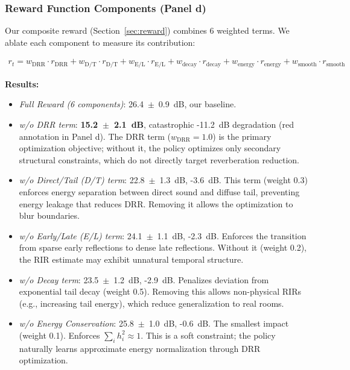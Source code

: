 \documentclass[12pt,a4paper]{article}
\begin{document}
\subsubsection{Reward Function Components (Panel d)}

Our composite reward (Section~\ref{sec:reward}) combines 6 weighted terms. We ablate each component to measure its contribution:

\begin{align}
r_t = w_\text{DRR} \cdot r_\text{DRR} + w_\text{D/T} \cdot r_\text{D/T} + w_\text{E/L} \cdot r_\text{E/L} + w_\text{decay} \cdot r_\text{decay} + w_\text{energy} \cdot r_\text{energy} + w_\text{smooth} \cdot r_\text{smooth}
\end{align}

\textbf{Results:}
\begin{itemize}
\item \textit{Full Reward (6 components)}: 26.4~$\pm$~0.9~dB, our baseline.

\item \textit{w/o DRR term}: \textbf{15.2~$\pm$~2.1~dB}, catastrophic -11.2~dB degradation (red annotation in Panel d). The DRR term ($w_\text{DRR}=1.0$) is the primary optimization objective; without it, the policy optimizes only secondary structural constraints, which do not directly target reverberation reduction.

\item \textit{w/o Direct/Tail (D/T) term}: 22.8~$\pm$~1.3~dB, -3.6~dB. This term (weight 0.3) enforces energy separation between direct sound and diffuse tail, preventing energy leakage that reduces DRR. Removing it allows the optimization to blur boundaries.

\item \textit{w/o Early/Late (E/L) term}: 24.1~$\pm$~1.1~dB, -2.3~dB. Enforces the transition from sparse early reflections to dense late reflections. Without it (weight 0.2), the RIR estimate may exhibit unnatural temporal structure.

\item \textit{w/o Decay term}: 23.5~$\pm$~1.2~dB, -2.9~dB. Penalizes deviation from exponential tail decay (weight 0.5). Removing this allows non-physical RIRs (e.g., increasing tail energy), which reduce generalization to real rooms.

\item \textit{w/o Energy Conservation}: 25.8~$\pm$~1.0~dB, -0.6~dB. The smallest impact (weight 0.1). Enforces $\sum_i h_i^2 \approx 1$. This is a soft constraint; the policy naturally learns approximate energy normalization through DRR optimization.
\end{itemize}
\end{document}
